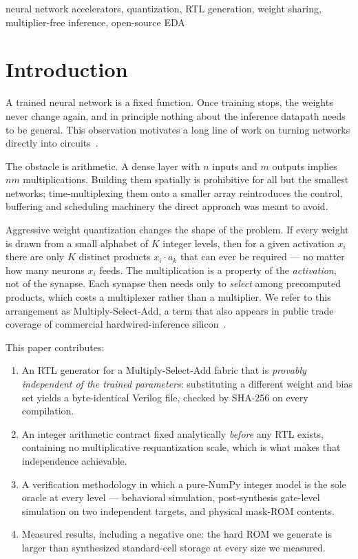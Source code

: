 \documentclass[conference]{IEEEtran}
\begin{document}
\begin{IEEEkeywords}
neural network accelerators, quantization, RTL generation, weight sharing,
multiplier-free inference, open-source EDA
\end{IEEEkeywords}

\section{Introduction}

A trained neural network is a fixed function. Once training stops, the weights
never change again, and in principle nothing about the inference datapath needs
to be general. This observation motivates a long line of work on turning
networks directly into circuits~\cite{finn,logicnets,hls4ml}.

The obstacle is arithmetic. A dense layer with $n$ inputs and $m$ outputs
implies $nm$ multiplications. Building them spatially is prohibitive for all
but the smallest networks; time-multiplexing them onto a smaller array
reintroduces the control, buffering and scheduling machinery the direct
approach was meant to avoid.

Aggressive weight quantization changes the shape of the problem. If every
weight is drawn from a small alphabet of $K$ integer levels, then for a given
activation $x_i$ there are only $K$ distinct products $x_i \cdot a_k$ that can
ever be required --- no matter how many neurons $x_i$ feeds. The multiplication
is a property of the \emph{activation}, not of the synapse. Each synapse then
needs only to \emph{select} among precomputed products, which costs a
multiplexer rather than a multiplier. We refer to this arrangement as
Multiply-Select-Add, a term that also appears in public trade coverage of
commercial hardwired-inference silicon~\cite{taalas}.

This paper contributes:

\begin{enumerate}
\item An RTL generator for a Multiply-Select-Add fabric that is
\emph{provably independent of the trained parameters}: substituting a different
weight and bias set yields a byte-identical Verilog file, checked by SHA-256 on
every compilation.
\item An integer arithmetic contract fixed analytically \emph{before} any RTL
exists, containing no multiplicative requantization scale, which is what makes
that independence achievable.
\item A verification methodology in which a pure-NumPy integer model is the
sole oracle at every level --- behavioral simulation, post-synthesis gate-level
simulation on two independent targets, and physical mask-ROM contents.
\item Measured results, including a negative one: the hard ROM we generate is
larger than synthesized standard-cell storage at every size we measured.
\end{enumerate}
\end{document}
